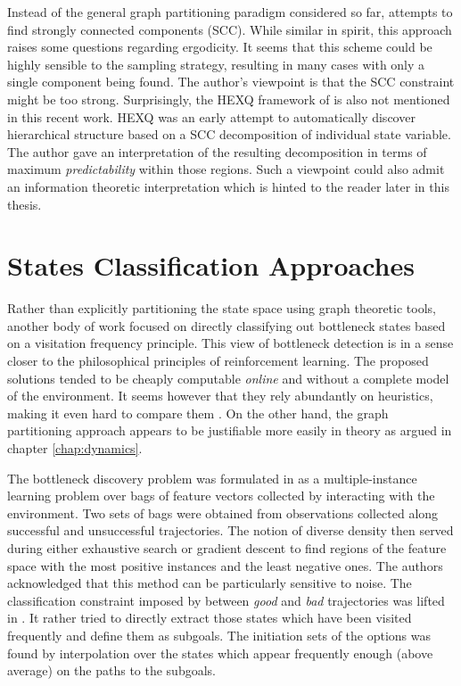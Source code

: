 Instead of the general graph partitioning paradigm considered so far, \cite{Kazemitabar2009} attempts to find strongly connected components (SCC). While similar in spirit, this approach raises some questions regarding ergodicity. It seems that this scheme could be highly sensible to the sampling strategy, resulting in many cases with only a single component being found. The author's viewpoint is that the SCC constraint might be too strong. Surprisingly, the \textsc{HEXQ} framework of \cite{Hengst2002} is also not mentioned in this recent work. \textsc{HEXQ} was an early attempt to automatically discover hierarchical structure based on a SCC decomposition of individual state variable. The author gave an interpretation of the resulting decomposition in terms of maximum \textit{predictability} within those regions. Such a viewpoint could also admit an information theoretic interpretation which is hinted to the reader later in this thesis.

\section{States Classification Approaches}
Rather than explicitly partitioning the state space using graph theoretic tools, another body of work focused on directly classifying out bottleneck states based on a visitation frequency principle. This view of bottleneck detection is in a sense closer to the philosophical principles of reinforcement learning. The proposed solutions tended to be cheaply computable \textit{online} and without a complete model of the environment. It seems however that they rely abundantly on heuristics, making it even hard to compare them . On the other hand, the graph partitioning approach appears to be justifiable more easily in theory as argued in chapter \ref{chap:dynamics}.

The bottleneck discovery problem was formulated in \cite{Mcgovern2001} as a multiple-instance learning problem over bags of feature vectors collected by interacting with the environment. Two sets of bags were obtained from observations collected along successful and unsuccessful trajectories. The notion of diverse density then served  during either exhaustive search or gradient descent to find regions of the feature space with the most positive instances and the least negative ones. The authors acknowledged  that this method can be particularly sensitive to noise. The classification constraint imposed  by \cite{Mcgovern2001} between \textit{good} and \textit{bad} trajectories was lifted in \cite{Stolle2002}. It rather tried to directly extract those states which have been visited frequently and define them as subgoals. The initiation sets of the options was found by interpolation over the states which appear frequently enough (above average) on the paths to the subgoals.

